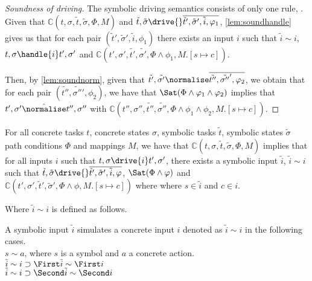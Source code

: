 \begin{proof}[Soundness of driving]
  The symbolic driving semantics consists of only one rule, .
  Given that $\mathds{C}(t,\sigma,\tilde{t},\tilde{\sigma},\Phi,M)$ and $\tilde{t},\tilde{\sigma}\drive{}\overline{\tilde{t}',\tilde{\sigma}',\tilde{i},\phi_1}$,
  \cref{lem:soundhandle} gives us that for each pair $(\tilde{t}',\tilde{\sigma}',\tilde{i},\phi_1)$
  there exists an input $i$ such that $\tilde{i}\sim i$, $t,\sigma\handle{i}t',\sigma'$
  and $\mathds{C}(t',\sigma',\tilde{t'},\tilde{\sigma'},\Phi\land\phi_1,M.[s\mapsto c])$.

  Then, by \cref{lem:soundnorm}, given that $\tilde{t'},\tilde{\sigma'}\normalise\overline{\tilde{t''},\tilde{\sigma''}',\phi_2}$,
  we obtain that for each pair $(\tilde{t''},\tilde{\sigma''}',\phi_2)$, we have that $\Sat(\Phi\land\phi_1\land\phi_2)$ implies
  that $t',\sigma'\hat{\normalise}t'',\sigma''$ with $\mathds{C}(t'',\sigma'',\tilde{t''},\tilde{\sigma''},\Phi\land\phi_1\land\phi_2,M.[s\mapsto c])$.
\end{proof}



\begin{lemma}
  \label{lem:completedriving}
  For all concrete tasks $t$, concrete states $\sigma$, symbolic tasks $\tilde{t}$, symbolic states $\tilde{\sigma}$ path conditions $\Phi$ and mappings $M$,
  we have that $\mathds{C}(t,\sigma,\tilde{t},\tilde{\sigma},\Phi,M)$ implies
  that for all inputs $i$ such that $t,\sigma\drive{i}t',\sigma'$,
  there exists a symbolic input $\tilde{i}$, $\tilde{i}\sim i$ such that
  $\tilde{t},\tilde{\sigma}\drive{}\overline{\tilde{t}',\tilde{\sigma}',\tilde{i},\phi}$, $\Sat(\Phi\land\phi)$ and $\mathds{C}(t',\sigma',\tilde{t}',\tilde{\sigma}',\Phi\land\phi,M.[s\mapsto c])$ where where $s\in\tilde{i}$ and $c\in i$.
\end{lemma}

Where $\tilde{i}\sim i$ is defined as follows.

\begin{definition}
  A symbolic input $\tilde{i}$ simulates a concrete input $i$ denoted as $\tilde{i}\sim i$ in the following cases.\\
  $s\sim a$, where $s$ is a symbol and $a$ a concrete action.\\
  $\tilde{i}\sim i\implies \First \tilde{i} \sim \First i$\\
  $\tilde{i}\sim i\implies \Second \tilde{i} \sim \Second i$
\end{definition}

